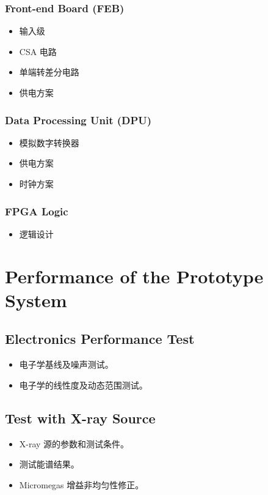 \subsubsection{Front-end Board (FEB)}
\begin{itemize}
    \item 输入级
    \item CSA 电路
    \item 单端转差分电路
    \item 供电方案
\end{itemize}

\subsubsection{Data Processing Unit (DPU)}
\begin{itemize}
    \item 模拟数字转换器
    \item 供电方案
    \item 时钟方案
\end{itemize}

\subsubsection{FPGA Logic}
\begin{itemize}
    \item 逻辑设计
\end{itemize}

\section{Performance of the Prototype System}

\subsection{Electronics Performance Test}
\begin{itemize}
    \item 电子学基线及噪声测试。
    \item 电子学的线性度及动态范围测试。
\end{itemize}

\subsection{Test with X-ray Source}
\begin{itemize}
    \item X-ray 源的参数和测试条件。
    \item 测试能谱结果。
    \item Micromegas 增益非均匀性修正。
\end{itemize}

